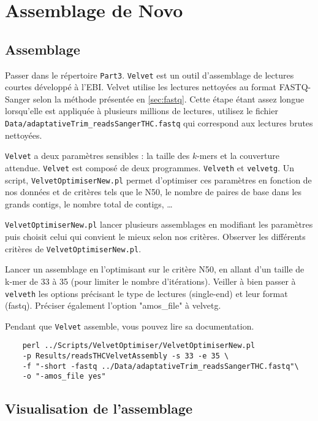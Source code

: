 \documentclass[a4paper,12pt]{article}
\begin{document}
\section{Assemblage de Novo}
\label{sec:assd}
\subsection{Assemblage}
Passer dans le répertoire \verb=Part3=. \verb=Velvet= est un outil d'assemblage de lectures courtes développé à l'EBI. Velvet utilise les lectures nettoyées au format FASTQ-Sanger selon la méthode présentée en \ref{sec:fastq}. Cette étape étant assez longue lorsqu'elle est appliquée à plusieurs millions de lectures, utilisez le fichier \verb=Data/adaptativeTrim_readsSangerTHC.fastq= qui correspond aux lectures brutes nettoyées.

\verb=Velvet= a deux paramètres sensibles : la taille des $k$-mers et la couverture attendue. \verb=Velvet= est composé de deux programmes. \verb=Velveth= et \verb=velvetg=.
Un script, \verb=VelvetOptimiserNew.pl= permet d'optimiser ces paramètres en fonction de nos données et de critères tels que le N50, le nombre de paires de base dans les grands contigs, le nombre total de contigs, \ldots

\verb=VelvetOptimiserNew.pl= lancer plusieurs assemblages en modifiant les paramètres puis choisit celui qui convient le mieux selon nos critères.
Observer les différents critères de \verb=VelvetOptimiserNew.pl=.

Lancer un assemblage en l'optimisant sur le critère N50, en allant d'un taille de k-mer de 33 à 35 (pour limiter le nombre d'itérations). Veiller à bien passer à \verb=velveth= les options précisant le type de lectures (single-end) et leur format (fastq). Préciser également l'option "amos\_file" à velvetg.

Pendant que \verb=Velvet= assemble, vous pouvez lire sa documentation.


\begin{lstlisting}	
	perl ../Scripts/VelvetOptimiser/VelvetOptimiserNew.pl 
	-p Results/readsTHCVelvetAssembly -s 33 -e 35 \
	-f "-short -fastq ../Data/adaptativeTrim_readsSangerTHC.fastq"\
	-o "-amos_file yes"
\end{lstlisting}	


\subsection{Visualisation de l'assemblage}
\end{document}
